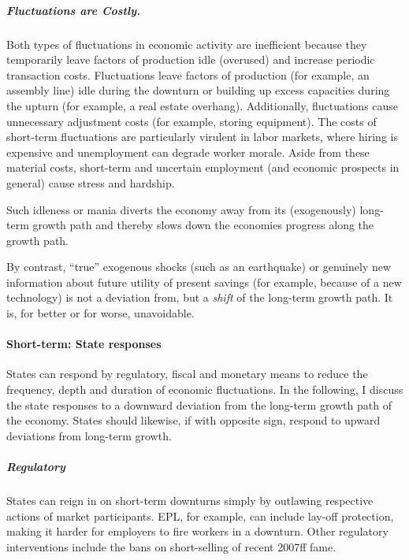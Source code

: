 \subparagraph{Fluctuations are Costly.} Both types of fluctuations in economic activity are inefficient because they temporarily leave factors of production idle (overused) and increase periodic transaction costs. Fluctuations leave factors of production (for example, an assembly line) idle during the downturn or building up excess capacities during the upturn (for example, a real estate overhang). Additionally, fluctuations cause unnecessary adjustment costs (for example, storing equipment). The costs of short-term fluctuations are particularly virulent in labor markets, where hiring is expensive and unemployment can degrade worker morale. Aside from these material costs, short-term and uncertain employment (and economic prospects in general) cause stress and hardship. %

Such idleness or mania diverts the economy away from its (exogenously) long-term growth path and thereby slows down the economies progress along the growth path.

By contrast, ``true'' exogenous shocks (such as an earthquake) or genuinely new information about future utility of present savings (for example, because of a new technology) is not a deviation from, but a \emph{shift} of the long-term growth path. It is, for better or for worse, unavoidable.

\paragraph{Short-term: State responses}
States can respond by regulatory, fiscal and monetary means to reduce the frequency, depth and duration of economic fluctuations. In the following, I discuss the state responses to a downward deviation from the long-term growth path of the economy. States should likewise, if with opposite sign, respond to upward deviations from long-term growth.

\subparagraph{Regulatory}
States can reign in on short-term downturns simply by outlawing respective actions of market participants. \gls{EPL}, for example, can include lay-off protection, making it harder for employers to fire workers in a downturn. Other regulatory interventions include the bans on short-selling of recent 2007ff fame. %

